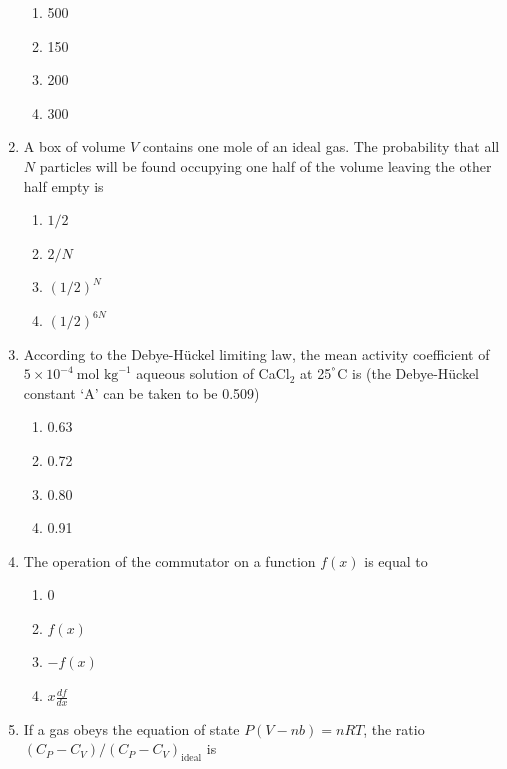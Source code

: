 \documentclass[12pt]{article}
\begin{document}
\begin{enumerate}
\begin{enumerate}
\item 500
\item 150
\item 200
\item 300
\end{enumerate}    \hfill{}




\item A box of volume $V$ contains one mole of an ideal gas. The probability that all $N$ particles will be found occupying one half of the volume leaving the other half empty is

\begin{enumerate}
\item $1/2$
\item $2/N$
\item $(1/2)^N$
\item $(1/2)^{6N}$
\end{enumerate}    \hfill{}




\item According to the Debye-Hückel limiting law, the mean activity coefficient of $5 \times 10^{-4}~\text{mol kg}^{-1}$ aqueous solution of CaCl$_2$ at 25$^\degree$C is (the Debye-Hückel constant ‘A’ can be taken to be 0.509)

\begin{enumerate}
\item 0.63
\item 0.72
\item 0.80
\item 0.91
\end{enumerate}    \hfill{}




\item The operation of the commutator 
 on a function $f(x)$ is equal to

\begin{enumerate}
\item 0
\item $f(x)$
\item $-f(x)$
\item $x \frac{df}{dx}$
\end{enumerate}    \hfill{}




\item If a gas obeys the equation of state $P (V - nb) = nRT$, the ratio $(C_P - C_V)/(C_P - C_V)_{\text{ideal}}$ is


\end{enumerate}
\end{document}
